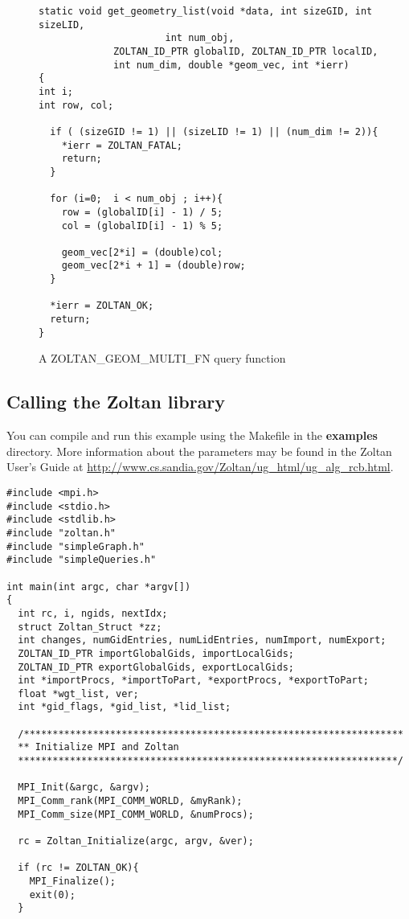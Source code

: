 \begin{figure}
\begin{flushleft}
\begin{verbatim}
static void get_geometry_list(void *data, int sizeGID, int sizeLID,
                      int num_obj,
             ZOLTAN_ID_PTR globalID, ZOLTAN_ID_PTR localID,
             int num_dim, double *geom_vec, int *ierr)
{
int i;
int row, col;
   
  if ( (sizeGID != 1) || (sizeLID != 1) || (num_dim != 2)){
    *ierr = ZOLTAN_FATAL; 
    return;
  }
    
  for (i=0;  i < num_obj ; i++){
    row = (globalID[i] - 1) / 5;
    col = (globalID[i] - 1) % 5;
  
    geom_vec[2*i] = (double)col;
    geom_vec[2*i + 1] = (double)row;
  }

  *ierr = ZOLTAN_OK;
  return;
} 
\end{verbatim}
\end{flushleft}
\caption{A ZOLTAN\_GEOM\_MULTI\_FN query function}
\label{fig:GeomMulti}
\end{figure}

\clearpage
\subsection{Calling the Zoltan library}

You can compile and run this example using the Makefile in the
\textbf{examples} directory.  More information about the parameters
may be found in the Zoltan User's Guide at
\url{http://www.cs.sandia.gov/Zoltan/ug_html/ug_alg_rcb.html}.


\begin{flushleft}
\begin{verbatim}
#include <mpi.h>
#include <stdio.h>
#include <stdlib.h>
#include "zoltan.h"
#include "simpleGraph.h"
#include "simpleQueries.h"

int main(int argc, char *argv[])
{
  int rc, i, ngids, nextIdx;
  struct Zoltan_Struct *zz;
  int changes, numGidEntries, numLidEntries, numImport, numExport;
  ZOLTAN_ID_PTR importGlobalGids, importLocalGids;
  ZOLTAN_ID_PTR exportGlobalGids, exportLocalGids; 
  int *importProcs, *importToPart, *exportProcs, *exportToPart;
  float *wgt_list, ver;
  int *gid_flags, *gid_list, *lid_list;

  /******************************************************************
  ** Initialize MPI and Zoltan
  ******************************************************************/

  MPI_Init(&argc, &argv);
  MPI_Comm_rank(MPI_COMM_WORLD, &myRank);
  MPI_Comm_size(MPI_COMM_WORLD, &numProcs);

  rc = Zoltan_Initialize(argc, argv, &ver);

  if (rc != ZOLTAN_OK){
    MPI_Finalize();
    exit(0);
  }
\end{verbatim}
\end{flushleft}

